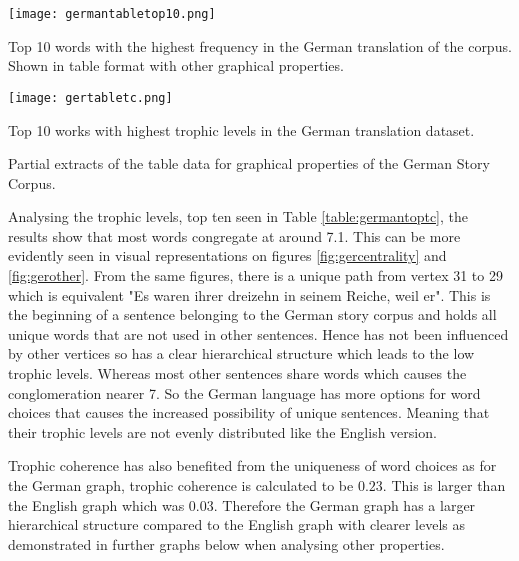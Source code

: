 \begin{table}[H]
\centering
\begin{subtable}{.45\textwidth}
	\texttt{[image: germantabletop10.png]}
	\caption{Top 10 words with the highest frequency in the German translation of the corpus. Shown in table format with other graphical properties. }
	\label{table:germantop}
\end{subtable}
\hfill
\begin{subtable}{.45\textwidth}
	\hspace{1.5cm} 
	\texttt{[image: gertabletc.png]}
	\caption{Top 10 works with highest trophic levels in the German translation dataset.}
	\label{table:germantoptc}
\end{subtable}
\caption{Partial extracts of the table data for graphical properties of the German Story Corpus.}
\end{table}

Analysing the trophic levels, top ten seen in Table \ref{table:germantoptc}, the results show that most words congregate at around 7.1. This can be more evidently seen in visual representations on figures \ref{fig:gercentrality} and \ref{fig:gerother}. From the same figures, there is a unique path from vertex 31 to 29 which is equivalent "Es waren ihrer dreizehn in seinem Reiche, weil er". This is the beginning of a sentence belonging to the German story corpus and holds all unique words that are not used in other sentences. Hence has not been influenced by other vertices so has a clear hierarchical structure which leads to the low trophic levels. Whereas most other sentences share words which causes the conglomeration nearer 7. So the German language has more options for word choices that causes the increased possibility of unique sentences. Meaning that their trophic levels are not evenly distributed like the English version. 

Trophic coherence has also benefited from the uniqueness of word choices as for the German graph, trophic coherence is calculated to be $0.23$. This is larger than the English graph which was 0.03. Therefore the German graph has a larger hierarchical structure compared to the English graph with clearer levels as demonstrated in further graphs below when analysing other properties.

